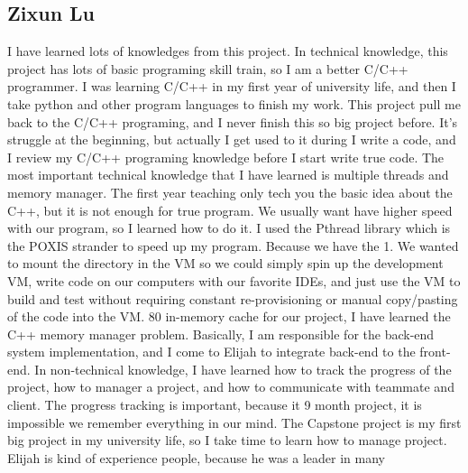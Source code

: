 
\subsection{Zixun Lu}
I have learned lots of knowledges from this project. In technical knowledge, this project has lots of basic programing
skill train, so I am a better C/C++ programmer. I was learning C/C++ in my first year of university life, and then I
take python and other program languages to finish my work. This project pull me back to the C/C++ programing, and
I never finish this so big project before. It’s struggle at the beginning, but actually I get used to it during I write a code,
and I review my C/C++ programing knowledge before I start write true code. The most important technical knowledge
that I have learned is multiple threads and memory manager. The first year teaching only tech you the basic idea about
the C++, but it is not enough for true program. We usually want have higher speed with our program, so I learned
how to do it. I used the Pthread library which is the POXIS strander to speed up my program. Because we have the
1. We wanted to mount the directory in the VM so we could simply spin up the development VM, write code on our computers with our
favorite IDEs, and just use the VM to build and test without requiring constant re-provisioning or manual copy/pasting of the code into the
VM.
80
in-memory cache for our project, I have learned the C++ memory manager problem. Basically, I am responsible for the
back-end system implementation, and I come to Elijah to integrate back-end to the front-end.
In non-technical knowledge, I have learned how to track the progress of the project, how to manager a project, and
how to communicate with teammate and client. The progress tracking is important, because it 9 month project, it is
impossible we remember everything in our mind. The Capstone project is my first big project in my university life,
so I take time to learn how to manage project. Elijah is kind of experience people, because he was a leader in many

